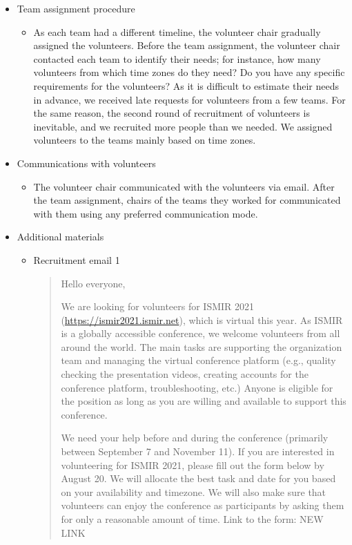 \documentclass[%
10pt,								%
]
{scrartcl}
\begin{document}
\begin{itemize}
\begin{itemize}
                \end{itemize}
            \item   Team assignment procedure
                \begin{itemize}
                    \item   As each team had a different timeline, the volunteer chair gradually assigned the volunteers. Before the team assignment, the volunteer chair contacted each team to identify their needs; for instance, how many volunteers from which time zones do they need? Do you have any specific requirements for the volunteers? As it is difficult to estimate their needs in advance, we received late requests for volunteers from a few teams. For the same reason, the second round of recruitment of volunteers is inevitable, and we recruited more people than we needed. We assigned volunteers to the teams mainly based on time zones. 
                \end{itemize}
            \item   Communications with volunteers
                \begin{itemize}
                    \item  The volunteer chair communicated with the volunteers via email. After the team assignment, chairs of the teams they worked for communicated with them using any preferred communication mode.  
                \end{itemize}
            \item   Additional materials
                \begin{itemize}
                    \item Recruitment email 1
                        \begin{quote}
                            Hello everyone, 

We are looking for volunteers for ISMIR 2021 (\href{https://ismir2021.ismir.net}{https://ismir2021.ismir.net}), which is virtual this year. As ISMIR is a globally accessible conference, we welcome volunteers from all around the world. The main tasks are supporting the organization team and managing the virtual conference platform (e.g., quality checking the presentation videos, creating accounts for the conference platform, troubleshooting, etc.) Anyone is eligible for the position as long as you are willing and available to support this conference.

We need your help before and during the conference (primarily between September 7 and November 11). If you are interested in volunteering for ISMIR 2021, please fill out the form below by August 20. We will allocate the best task and date for you based on your availability and timezone. We will also make sure that volunteers can enjoy the conference as participants by asking them for only a reasonable amount of time. 
Link to the form: NEW LINK


\end{quote}
\end{itemize}
\end{itemize}
\end{document}

